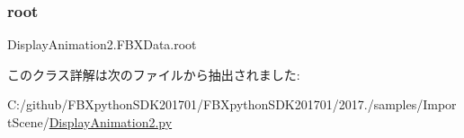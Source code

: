 \mbox{\label{class_display_animation2_1_1_f_b_x_data_a29126173d4927c772739a4ba4ef5bd67}} 
\subsubsection{\texorpdfstring{root}{root}}
{\footnotesize\ttfamily Display\+Animation2.\+F\+B\+X\+Data.\+root}



このクラス詳解は次のファイルから抽出されました\+:\begin{DoxyCompactItemize}
\item 
C\+:/github/\+F\+B\+Xpython\+S\+D\+K201701/\+F\+B\+Xpython\+S\+D\+K201701/2017./samples/\+Import\+Scene/\hyperlink{_display_animation2_8py}{Display\+Animation2.\+py}\end{DoxyCompactItemize}
